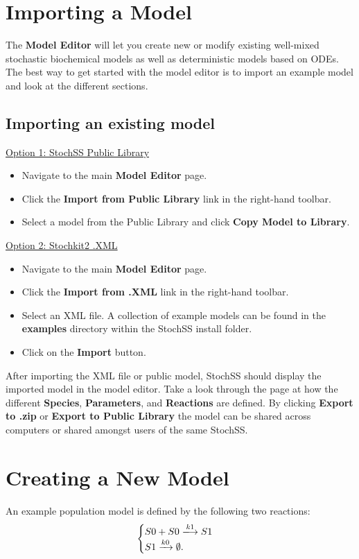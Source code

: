 \section{\label{sec:imp} Importing a Model}
The \textbf{Model Editor} will let you create new or modify existing well-mixed stochastic biochemical models as well as deterministic models based on ODEs.
The best way to get started with the model editor is to import an example model and look at the different sections.

\subsection{Importing an existing model}

\underline{Option 1: StochSS Public Library}
\begin{itemize}
  \item Navigate to the main \textbf{Model Editor} page.
  \item Click the \textbf{Import from Public Library} link in the right-hand toolbar.
  \item Select a model from the Public Library and click \textbf{Copy Model to Library}.
\end{itemize}

\noindent\underline{Option 2: Stochkit2 .XML}
\begin{itemize}
  \item Navigate to the main \textbf{Model Editor} page.
  \item Click the \textbf{Import from .XML} link in the right-hand toolbar.
  \item Select an XML file. A collection of example models can be found in the \textbf{examples} directory within the StochSS install folder.
  \item Click on the \textbf{Import} button.
\end{itemize}

After importing the XML file or public model, StochSS should display the imported model in the model editor.
Take a look through the page at how the different \textbf{Species}, \textbf{Parameters}, and \textbf{Reactions} are defined.
By clicking \textbf{Export to .zip} or \textbf{Export to Public Library} the model can be shared across computers or shared amongst users of the same StochSS.

\section{Creating a New Model}
An example population model is defined by the following two reactions:
\[ \begin{cases}
S0 + S0 \xlongrightarrow{k1} S1 \nonumber \\
S1 \xrightarrow{k0} \emptyset . \nonumber 
\end{cases} \]

